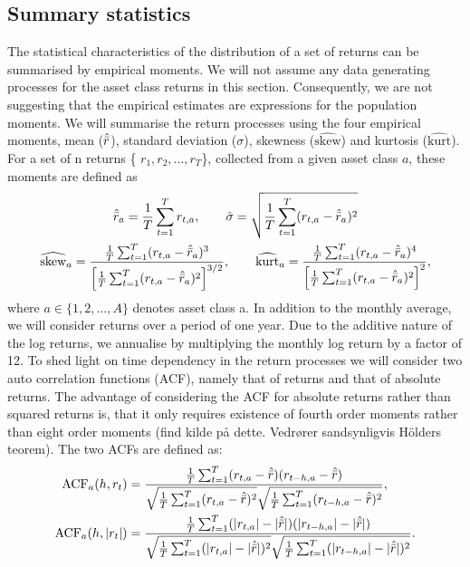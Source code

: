 \documentclass[11pt,a4paper,oneside]{article}
\newcommand{\rb}{\right]}
\newcommand{\lb}{\left[}
\begin{document}
\subsection*{Summary statistics}
\noindent The statistical characteristics of the distribution of a set of returns can be summarised by empirical moments. We will not assume any data generating processes for the asset class returns in this section. Consequently, we are not suggesting that the empirical estimates are expressions for the population moments. We will summarise the return processes using the four empirical moments, mean ($\hat{\Bar{r}}$), standard deviation ($\sigma$), skewness ($\widehat{\text{skew}}$) and kurtosis ($\widehat{\text{kurt}}$). For a set of n returns \{ $r_1, r_2,...,r_T$\}, collected from a given asset class $a$, these moments are defined as 
\begin{gather}
    \hat{\Bar{r}}_a=\frac{1}{T}\sum_{t=1}^{T}r_{t,a}, \qquad \hat{\sigma}= \sqrt{\frac{1}{T}\sum_{t=1}^{T}(r_{t,a}-\hat{\Bar{r}}_a)^2} \label{meanvol} \\ 
    \widehat{\text{skew}}_a=\frac{\frac{1}{T}\sum_{t=1}^{T}(r_{t,a}-\hat{\Bar{r}}_a)^3}{\lb\frac{1}{T}\sum_{t=1}^{T}(r_{t,a}-\hat{\Bar{r}}_a)^2\rb^{3/2}}
    , \qquad \widehat{\text{kurt}}_a=\frac{\frac{1}{T}\sum_{t=1}^{T}(r_{t,a}-\hat{\Bar{r}}_a)^4}{\lb\frac{1}{T}\sum_{t=1}^{T}(r_{t,a}-\hat{\Bar{r}}_a)^2\rb^{2}} \label{skewkurt},
\end{gather}
where $a \in \{1,2,...,A\}$ denotes asset class a. In addition to the monthly average, we will consider returns over a period of one year. Due to the additive nature of the log returns, we annualise by multiplying the monthly log return by a factor of 12\cite{Favero}. To shed light on time dependency in the return processes we will consider two auto correlation functions (ACF), namely that of returns and that of absolute returns. The advantage of considering the ACF for absolute returns rather than squared returns is, that it only requires existence of fourth order moments rather than eight order moments (find kilde på dette. Vedrører sandsynligvis Hölders teorem). The two ACFs are defined as:
\begin{align}
    \text{ACF}_a(h,r_t)&= \frac{\frac{1}{T}\sum_{t=1}^{T}(r_{t,a}-\hat{\Bar{r}})(r_{t-h,a}-\hat{\Bar{r}})}{\sqrt{\frac{1}{T}\sum_{t=1}^{T}(r_{t,a}-\hat{\Bar{r}})^2}\sqrt{\frac{1}{T}\sum_{t=1}^{T}(r_{t-h,a}-\hat{\Bar{r}})^2}} \label{acf} ,  \\
    \text{ACF}_a(h,\vert {r_t} \vert) &= \frac{\frac{1}{T}\sum_{t=1}^{T}(\vert r_{t,a} \vert-\vert\hat{\Bar{r}}\vert)(\vert r_{t-h,a}\vert-\vert\hat{\Bar{r}}\vert)}{\sqrt{\frac{1}{T}\sum_{t=1}^{T}(\vert r_{t,a}\vert-\vert\hat{\Bar{r}}\vert)^2}\sqrt{\frac{1}{T}\sum_{t=1}^{T}(\vert r_{t-h,a}\vert-\vert\hat{\Bar{r}}\vert)^2}} \label{acfabs}. 
\end{align}
\end{document}
